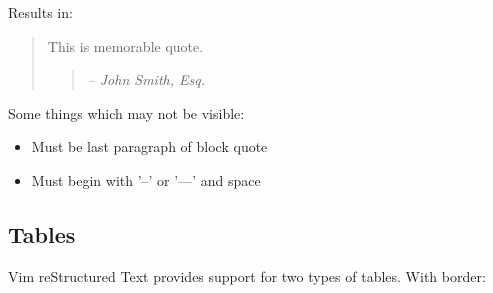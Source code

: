 \documentclass[12pt]{article}
\newcommand{\attribution}[1]{\raggedleft\textit{#1}}
\begin{document}
Results in:

 \begin{quotation}
 This is memorable quote.

 \begin{quotation}
 \attribution{-- John Smith, Esq.
 }
 \end{quotation}
 \end{quotation}

Some things which may not be visible:

 \begin{itemize}
\item
Must be last paragraph of block quote

\item
Must begin with '--' or '---' and space
\end{itemize}
\hypertarget{ltables}{}
\subsection{Tables}

Vim reStructured Text provides support for two types of tables. With border:
\end{document}
